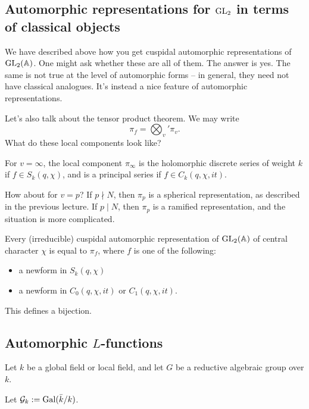 \documentclass[reqno]{amsart} 
\begin{document}
\subsection{Automorphic representations for $\operatorname{GL}_2$ in terms of classical objects}

We have described above how you get cuspidal automorphic representations of $\operatorname{GL}_2(\mathbb{A})$.  One might ask whether these are all of them.  The answer is yes.  The same is not true at the level of automorphic forms -- in general, they need not have classical analogues.  It's instead a nice feature of automorphic representations.

Let's also talk about the tensor product theorem.  We may write
\begin{equation*}
  \pi_f = \bigotimes_v' \pi_v.
\end{equation*}
What do these local components look like?

For $v = \infty$, the local component $\pi_\infty$ is the holomorphic discrete series of weight $k$ if $f \in S_k(q, \chi)$, and is a principal series if $f \in C_k(q, \chi, i t)$.

How about for $v = p$?  If $p \nmid N$, then $\pi_p$ is a spherical representation, as described in the previous lecture.  If $p \mid N$, then $\pi_p$ is a ramified representation, and the situation is more complicated.  

\begin{fact}
  Every (irreducible) cuspidal automorphic representation of $\operatorname{GL}_2(\mathbb{A})$ of central character $\chi$ is equal to $\pi_f$, where $f$ is one of the following:
  \begin{itemize}
  \item a newform in $S_k(q, \chi)$
  \item a newform in $C_0(q, \chi, i t)$ or $C_1(q, \chi, i t)$.
  \end{itemize}
  This defines a bijection.
\end{fact}

\subsection{Automorphic $L$-functions}

Let $k$ be a global field or local field, and let $G$ be a reductive algebraic group over $k$.

Let $\mathcal{G}_k := \operatorname{Gal}(\bar{k}/k)$.
\end{document}
